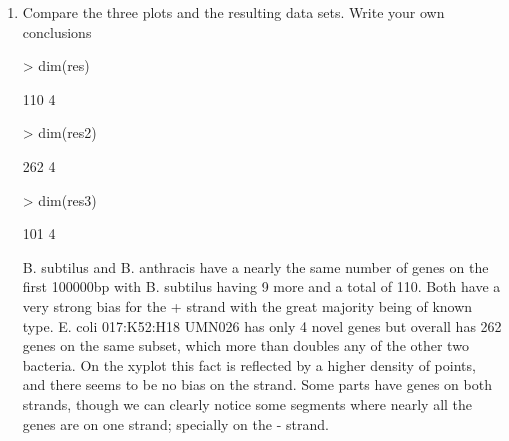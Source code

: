 \documentclass[letterpaper,12pt]{article}
\begin{document}
\begin{enumerate}
  \item Compare the three plots and the resulting data sets. Write your own conclusions
\begin{Schunk}
\begin{Sinput}
> dim(res)
\end{Sinput}
\begin{Soutput}
[1] 110   4
\end{Soutput}
\begin{Sinput}
> dim(res2)
\end{Sinput}
\begin{Soutput}
[1] 262   4
\end{Soutput}
\begin{Sinput}
> dim(res3)
\end{Sinput}
\begin{Soutput}
[1] 101   4
\end{Soutput}
\end{Schunk}
B. subtilus and B. anthracis have a nearly the same number of genes on the first 100000bp with B. subtilus having 9 more and a total of 110. Both have a very strong bias for the + strand with the great majority being of known type. E. coli 017:K52:H18 UMN026 has only 4 novel genes but overall has 262 genes on the same subset, which more than doubles any of the other two bacteria. On the xyplot this fact is reflected by a higher density of points, and there seems to be no bias on the strand. Some parts have genes on both strands, though we can clearly notice some segments where nearly all the genes are on one strand; specially on the - strand. 
  \end{enumerate}
\end{document}
